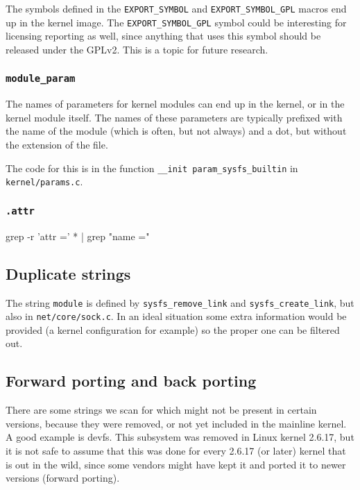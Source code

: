\documentclass[10pt]{article}
\begin{document}
The symbols defined in the \texttt{EXPORT\_SYMBOL} and
\texttt{EXPORT\_SYMBOL\_GPL} macros end up in the kernel image. The
\texttt{EXPORT\_SYMBOL\_GPL} symbol could be interesting for licensing
reporting as well, since anything that uses this symbol should be released
under the GPLv2. This is a topic for future research.

\subsubsection{\texttt{module\_param}}

The names of parameters for kernel modules can end up in the kernel, or in the
kernel module itself. The names of these parameters are typically prefixed
with the name of the module (which is often, but not always) and a dot, but
without the extension of the file.

The code for this is in the function \texttt{\_\_init param\_sysfs\_builtin} in
\texttt{kernel/params.c}.

\subsubsection{\texttt{.attr}}

grep -r 'attr =' * | grep "name ="

\subsection{Duplicate strings}

The string \texttt{module} is defined by \texttt{sysfs\_remove\_link} and
\texttt{sysfs\_create\_link}, but also in \texttt{net/core/sock.c}.
In an ideal situation some extra information would be provided (a kernel configuration for example) so the proper one can be filtered out.

\subsection{Forward porting and back porting}

There are some strings we scan for which might not be present in certain
versions, because they were removed, or not yet included in the mainline
kernel. A good example is devfs. This subsystem was removed in Linux kernel
2.6.17, but it is not safe to assume that this was done for every 2.6.17 (or
later) kernel that is out in the wild, since some vendors might have kept it
and ported it to newer versions (forward porting).
\end{document}
